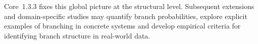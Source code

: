 Core~1.3.3 fixes this global picture at the structural level. Subsequent
extensions and domain-specific studies may quantify branch
probabilities, explore explicit examples of branching in concrete systems and
develop empirical criteria for identifying branch structure in real-world
data.

